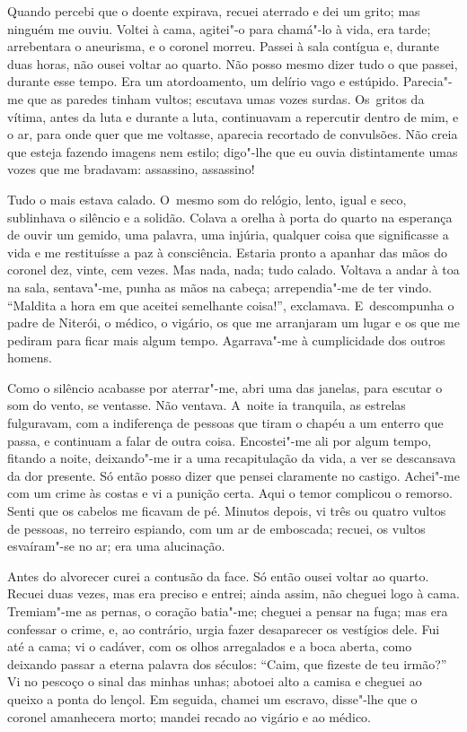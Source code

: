 \begin{linenumbers}
Quando percebi que o doente expirava, recuei aterrado e dei um grito;
mas ninguém me ouviu. Voltei à cama, agitei"-o para chamá"-lo à vida, era
tarde; arrebentara o aneurisma, e o coronel morreu. Passei à sala
contígua e, durante duas horas, não ousei voltar ao quarto. Não posso
mesmo dizer tudo o que passei, durante esse tempo. Era um atordoamento,
um delírio vago e estúpido. Parecia"-me que as paredes tinham vultos;
escutava umas vozes surdas. Os~gritos da vítima, antes da luta e durante
a luta, continuavam a repercutir dentro de mim, e o ar, para onde quer
que me voltasse, aparecia recortado de convulsões. Não creia que esteja
fazendo imagens nem estilo; digo"-lhe que eu ouvia distintamente umas
vozes que me bradavam: assassino, assassino!

Tudo o mais estava calado. O~mesmo som do relógio, lento, igual e seco,
sublinhava o silêncio e a solidão. Colava a orelha à porta do quarto na
esperança de ouvir um gemido, uma palavra, uma injúria, qualquer coisa
que significasse a vida e me restituísse a paz à consciência. Estaria
pronto a apanhar das mãos do coronel dez, vinte, cem vezes. Mas nada,
nada; tudo calado. Voltava a andar à toa na sala, sentava"-me, punha as
mãos na cabeça; arrependia"-me de ter vindo. ``Maldita a hora em que
aceitei semelhante coisa!'', exclamava. E~descompunha o padre de
Niterói, o médico, o vigário, os que me arranjaram um lugar e os que me
pediram para ficar mais algum tempo. Agarrava"-me à cumplicidade dos
outros homens.

Como o silêncio acabasse por aterrar"-me, abri uma das janelas, para
escutar o som do vento, se ventasse. Não ventava. A~noite ia tranquila,
as estrelas fulguravam, com a indiferença de pessoas que tiram o chapéu
a um enterro que passa, e continuam a falar de outra coisa. Encostei"-me
ali por algum tempo, fitando a noite, deixando"-me ir a uma recapitulação
da vida, a ver se descansava da dor presente. Só então posso dizer que
pensei claramente no castigo. Achei"-me com um crime às costas e vi a
punição certa. Aqui o temor complicou o remorso. Senti que os cabelos me
ficavam de pé. Minutos depois, vi três ou quatro vultos de pessoas, no
terreiro espiando, com um ar de emboscada; recuei, os vultos esvaíram"-se
no ar; era uma alucinação.

Antes do alvorecer curei a contusão da face. Só então ousei voltar ao
quarto. Recuei duas vezes, mas era preciso e entrei; ainda assim, não
cheguei logo à cama. Tremiam"-me as pernas, o coração batia"-me; cheguei a
pensar na fuga; mas era confessar o crime, e, ao contrário, urgia fazer
desaparecer os vestígios dele. Fui até a cama; vi o cadáver, com os
olhos arregalados e a boca aberta, como deixando passar a eterna palavra
dos séculos: ``Caim, que fizeste de teu irmão?'' Vi no pescoço o sinal
das minhas unhas; abotoei alto a camisa e cheguei ao queixo a ponta do
lençol. Em seguida, chamei um escravo, disse"-lhe que o coronel
amanhecera morto; mandei recado ao vigário e ao médico.


\end{linenumbers}
